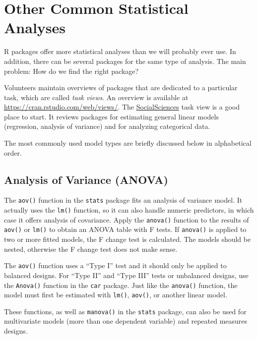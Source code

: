 \documentclass[doc,floatsintext]{apa6}
\begin{document}
\section{Other Common Statistical
Analyses}\label{other-common-statistical-analyses}

R packages offer more statistical analyses than we will probably ever
use. In addition, there can be several packages for the same type of
analysis. The main problem: How do we find the right package?

Volunteers maintain overviews of packages that are dedicated to a
particular task, which are called \emph{task views}. An overview is
available at \url{https://cran.rstudio.com/web/views/}. The
\href{https://cran.rstudio.com/web/views/SocialSciences.html}{SocialSciences}
task view is a good place to start. It reviews packages for estimating
general linear models (regression, analysis of variance) and for
analyzing categorical data.

The most commonly used model types are briefly discussed below in
alphabetical order.

\subsection{Analysis of Variance
(ANOVA)}\label{analysis-of-variance-anova}

The \texttt{aov()} function in the \texttt{stats} package fits an
analysis of variance model. It actually uses the \texttt{lm()} function,
so it can also handle numeric predictors, in which case it offers
analysis of covariance. Apply the \texttt{anova()} function to the
results of \texttt{aov()} or \texttt{lm()} to obtain an ANOVA table with
F tests. If \texttt{anova()} is applied to two or more fitted models,
the F change test is calculated. The models should be nested, otherwise
the F change test does not make sense.

The \texttt{aov()} function uses a \enquote{Type I} test and it should
only be applied to balanced designs. For \enquote{Type II} and
\enquote{Type III} tests or unbalanced designs, use the \texttt{Anova()}
function in the \texttt{car} package. Just like the \texttt{anova()}
function, the model must first be estimated with \texttt{lm()},
\texttt{aov()}, or another linear model.

These functions, as well as \texttt{manova()} in the \texttt{stats}
package, can also be used for multivariate models (more than one
dependent variable) and repeated measures designs.
\end{document}

